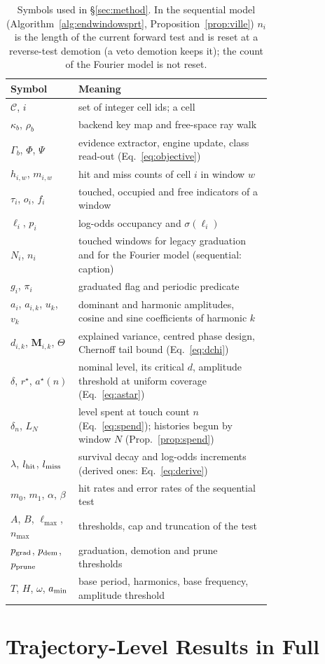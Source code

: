 \begin{table}[H]
\centering
\caption{Symbols used in \S\ref{sec:method}. In the sequential model (Algorithm~\ref{alg:endwindowsprt}, Proposition~\ref{prop:ville}) $n_i$ is the length of the current forward test and is reset at a reverse-test demotion (a veto demotion keeps it); the count of the Fourier model is not reset.}
\label{tab:notation}
\small
\begin{tabular}{lp{0.74\linewidth}}
\toprule
Symbol & Meaning \\
\midrule
$\mathcal{C}$, $i$ & set of integer cell ids; a cell \\
$\kappa_b$, $\rho_b$ & backend key map and free-space ray walk \\
$\Gamma_b$, $\Phi$, $\Psi$ & evidence extractor, engine update, class read-out (Eq.~\ref{eq:objective}) \\
$h_{i,w}$, $m_{i,w}$ & hit and miss counts of cell $i$ in window $w$ \\
$\tau_i$, $o_i$, $f_i$ & touched, occupied and free indicators of a window \\
$\ell_i$, $p_i$ & log-odds occupancy and $\sigma(\ell_i)$ \\
$N_i$, $n_i$ & touched windows for legacy graduation and for the Fourier model (sequential: caption) \\
$g_i$, $\pi_i$ & graduated flag and periodic predicate \\
$a_i$, $a_{i,k}$, $u_k$, $v_k$ & dominant and harmonic amplitudes, cosine and sine coefficients of harmonic $k$ \\
$d_{i,k}$, $\mathbf{M}_{i,k}$, $\Theta$ & explained variance, centred phase design, Chernoff tail bound (Eq.~\ref{eq:dchi}) \\
$\delta$, $r^\star$, $a^\star(n)$ & nominal level, its critical $d$, amplitude threshold at uniform coverage (Eq.~\ref{eq:astar}) \\
$\delta_n$, $L_N$ & level spent at touch count $n$ (Eq.~\ref{eq:spend}); histories begun by window $N$ (Prop.~\ref{prop:spend}) \\
$\lambda$, $l_{\mathrm{hit}}$, $l_{\mathrm{miss}}$ & survival decay and log-odds increments (derived ones: Eq.~\ref{eq:derive}) \\
$m_0$, $m_1$, $\alpha$, $\beta$ & hit rates and error rates of the sequential test \\
$A$, $B$, $\ell_{\max}$, $n_{\max}$ & thresholds, cap and truncation of the test \\
$p_{\mathrm{grad}}$, $p_{\mathrm{dem}}$, $p_{\mathrm{prune}}$ & graduation, demotion and prune thresholds \\
$T$, $H$, $\omega$, $a_{\min}$ & base period, harmonics, base frequency, amplitude threshold \\
\bottomrule
\end{tabular}
\end{table}

\section{Trajectory-Level Results in Full}\label{app:e5}


